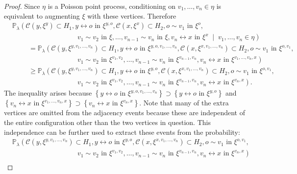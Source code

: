 \documentclass[10pt,a4paper,dvipsnames]{article}
\theoremstyle{definition}
\theoremstyle{remark}
\newcommand{\pla}{\mathbb P_\lambda}
\newcommand{\C}{\mathscr {C}}
\newcommand{\conn}[3]{#1 \longleftrightarrow #2\textrm { in } #3}
\newcommand{\adja}[3]{#1 \sim #2\textrm { in } #3}
\newcommand{\orig}{o}
\numberwithin{equation}{section}
\begin{document}
\begin{proof}
    Since $\eta$ is a Poisson point process, conditioning on $v_1,\ldots,v_n\in\eta$ is equivalent to augmenting $\xi$ with these vertices. Therefore
    \begin{align}
        &\pla\left(\C\left(y,\xi^{y}\right)\subset H_1, \conn{y}{\orig}{\xi^{y,\orig}}, \C\left(x,\xi^{x}\right)\subset  H_2,\adja{\orig}{v_1}{\xi^{\orig}},\right.\nonumber\\
        &\hspace{4cm}\left.\adja{v_1}{v_2}{\xi},\ldots,\adja{v_{n-1}}{v_n}{\xi},\conn{v_n}{x}{\xi^x}\;\middle|\;v_1,\ldots,v_n\in\eta\right)\nonumber\\
        &\hspace{1cm} = \pla\left(\C\left(y,\xi^{y,v_1,\ldots,v_n}\right)\subset H_1, \conn{y}{\orig}{\xi^{y,\orig,v_1,\ldots,v_n}}, \C\left(x,\xi^{x,v_1,\ldots,v_n}\right)\subset  H_2,\adja{\orig}{v_1}{\xi^{\orig,v_1}},\right.\nonumber\\
        &\hspace{4cm}\left.\adja{v_1}{v_2}{\xi^{v_1,v_2}},\ldots,\adja{v_{n-1}}{v_n}{\xi^{v_{n-1},v_n}},\conn{v_n}{x}{\xi^{v_1,\ldots,v_n,x}}\right)\nonumber\\
        &\hspace{1cm} \geq \pla\left(\C\left(y,\xi^{y,v_1,\ldots,v_n}\right)\subset H_1, \conn{y}{\orig}{\xi^{y,\orig}}, \C\left(x,\xi^{x,v_1,\ldots,v_n}\right)\subset  H_2,\adja{\orig}{v_1}{\xi^{\orig,v_1}},\right.\nonumber\\
        &\hspace{4cm}\left.\adja{v_1}{v_2}{\xi^{v_1,v_2}},\ldots,\adja{v_{n-1}}{v_n}{\xi^{v_{n-1},v_n}},\conn{v_n}{x}{\xi^{v_n,x}}\right).
    \end{align}
    The inequality arises because $\left\{\conn{y}{\orig}{\xi^{y,\orig,v_1,\ldots,v_n}}\right\}\supset \left\{\conn{y}{\orig}{\xi^{y,\orig}}\right\}$  and $\left\{\conn{v_n}{x}{\xi^{v_1,\ldots,v_n,x}}\right\}\supset \left\{\conn{v_n}{x}{\xi^{v_n,x}}\right\}$. Note that many of the extra vertices are omitted from the adjacency events because these are independent of the entire configuration other than the two vertices in question. This independence can be further used to extract these events from the probability:
    \begin{align}
        &\pla\left(\C\left(y,\xi^{y,v_1,\ldots,v_n}\right)\subset H_1, \conn{y}{\orig}{\xi^{y,\orig}}, \C\left(x,\xi^{x,v_1,\ldots,v_n}\right)\subset  H_2,\adja{\orig}{v_1}{\xi^{\orig,v_1}},\right.\nonumber\\
        &\hspace{4cm}\left.\adja{v_1}{v_2}{\xi^{v_1,v_2}},\ldots,\adja{v_{n-1}}{v_n}{\xi^{v_{n-1},v_n}},\conn{v_n}{x}{\xi^{v_n,x}}\right)\nonumber\\

\end{align}
\end{proof}
\end{document}
